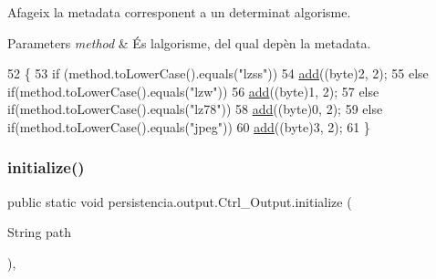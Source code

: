 Afageix la metadata corresponent a un determinat algorisme. 


\begin{DoxyParams}{Parameters}
{\em method} & És l\textquotesingle{}algorisme, del qual depèn la metadata. \\
\hline
\end{DoxyParams}

\begin{DoxyCode}
52                                            \{
53         \textcolor{keywordflow}{if} (method.toLowerCase().equals(\textcolor{stringliteral}{"lzss"}))
54             \hyperlink{classpersistencia_1_1output_1_1Ctrl__Output_a8c5aa5a6acb5259faeb1c05c71ddd21c}{add}((byte)2, 2);
55         \textcolor{keywordflow}{else} \textcolor{keywordflow}{if}(method.toLowerCase().equals(\textcolor{stringliteral}{"lzw"}))
56             \hyperlink{classpersistencia_1_1output_1_1Ctrl__Output_a8c5aa5a6acb5259faeb1c05c71ddd21c}{add}((byte)1, 2);
57         \textcolor{keywordflow}{else} \textcolor{keywordflow}{if}(method.toLowerCase().equals(\textcolor{stringliteral}{"lz78"}))
58             \hyperlink{classpersistencia_1_1output_1_1Ctrl__Output_a8c5aa5a6acb5259faeb1c05c71ddd21c}{add}((byte)0, 2);
59         \textcolor{keywordflow}{else} \textcolor{keywordflow}{if}(method.toLowerCase().equals(\textcolor{stringliteral}{"jpeg"}))
60             \hyperlink{classpersistencia_1_1output_1_1Ctrl__Output_a8c5aa5a6acb5259faeb1c05c71ddd21c}{add}((byte)3, 2);
61     \}
\end{DoxyCode}
\mbox{\label{classpersistencia_1_1output_1_1Ctrl__Output_a83bd01197acdeb0a697f21ca9854c457}} 
\subsubsection{\texorpdfstring{initialize()}{initialize()}}
{\footnotesize\ttfamily public static void persistencia.\+output.\+Ctrl\+\_\+\+Output.\+initialize (\begin{DoxyParamCaption}\item[{String}]{path }\end{DoxyParamCaption})\hspace{0.3cm}{\ttfamily [inline]}, {\ttfamily [static]}}




